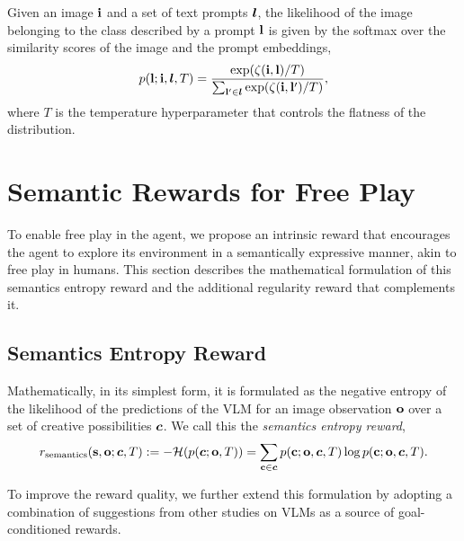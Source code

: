 Given an image \(\mathbf{i}\) and a set of text prompts \(\bm{l}\), the likelihood of the image belonging to the class described by a prompt \(\mathbf{l}\) is given by the softmax over the similarity scores of the image and the prompt embeddings,
\begin{equation}
    \label{eq:clip-dist}
    p(\mathbf{l}; \mathbf{i}, \bm{l}, T) = \frac{\exp(\zeta(\mathbf{i}, \mathbf{l})/T)}{\sum_{\mathbf{l}' \in \bm{l}} \exp(\zeta(\mathbf{i}, \mathbf{l}')/T)},
\end{equation}
where \(T\) is the temperature hyperparameter that controls the flatness of the distribution.

\section{Semantic Rewards for Free Play}
\label{sec:reward}
To enable free play in the agent, we propose an intrinsic reward that encourages the agent to explore its environment in a semantically expressive manner, akin to free play in humans.
This section describes the mathematical formulation of this semantics entropy reward and the additional regularity reward that complements it.

\subsection{Semantics Entropy Reward}
\label{sec:semantics-reward}

Mathematically, in its simplest form, it is formulated as the negative entropy of the likelihood of the predictions of the VLM for an image observation \(\mathbf{o}\) over a set of creative possibilities \(\bm{c}\).
We call this the \textit{semantics entropy reward},
\begin{equation}
    \label{eq:entropy-reward}
    r_{\text{semantics}}(\mathbf{s}, \mathbf{o}; \bm{c}, T) := -\mathcal{H}(p(\bm{c}; \mathbf{o}, T)) = \sum_{\mathbf{c} \in \bm{c}} p(\mathbf{c}; \mathbf{o}, \bm{c}, T) \log p(\mathbf{c}; \mathbf{o}, \bm{c}, T).
\end{equation}

To improve the reward quality, we further extend this formulation by adopting a combination of suggestions from other studies on VLMs as a source of goal-conditioned rewards.

